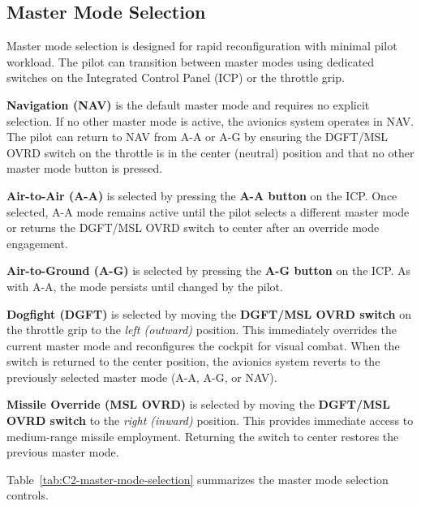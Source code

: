 \documentclass[11pt, a4paper, twoside]{report}
\begin{document}
\subsection{Master Mode Selection}
\label{sec:C2-S2-S2}

Master mode selection is designed for rapid reconfiguration with minimal pilot workload. The pilot can transition between master modes using dedicated switches on the Integrated Control Panel (ICP) or the throttle grip.

\textbf{Navigation (NAV)} is the default master mode and requires no explicit selection. If no other master mode is active, the avionics system operates in NAV. The pilot can return to NAV from A-A or A-G by ensuring the DGFT/MSL OVRD switch on the throttle is in the center (neutral) position and that no other master mode button is pressed.

\textbf{Air-to-Air (A-A)} is selected by pressing the \textbf{A-A button} on the ICP. Once selected, A-A mode remains active until the pilot selects a different master mode or returns the DGFT/MSL OVRD switch to center after an override mode engagement.

\textbf{Air-to-Ground (A-G)} is selected by pressing the \textbf{A-G button} on the ICP. As with A-A, the mode persists until changed by the pilot.

\textbf{Dogfight (DGFT)} is selected by moving the \textbf{DGFT/MSL OVRD switch} on the throttle grip to the \textit{left (outward)} position. This immediately overrides the current master mode and reconfigures the cockpit for visual combat. When the switch is returned to the center position, the avionics system reverts to the previously selected master mode (A-A, A-G, or NAV).

\textbf{Missile Override (MSL OVRD)} is selected by moving the \textbf{DGFT/MSL OVRD switch} to the \textit{right (inward)} position. This provides immediate access to medium-range missile employment. Returning the switch to center restores the previous master mode.

Table~\ref{tab:C2-master-mode-selection} summarizes the master mode selection controls.

\small
\renewcommand{\arraystretch}{1.2}
\end{document}
